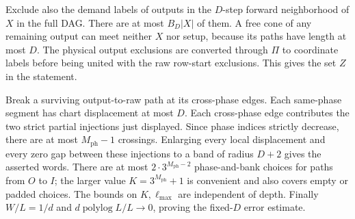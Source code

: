 \begin{informalproof}
Exclude also the demand labels of outputs in the $D$-step forward
neighborhood of $X$ in the full DAG.  There are at most $B_D|X|$ of them.
A free cone of any remaining output can meet neither $X$ nor setup,
because its paths have length at most $D$.  The physical output exclusions
are converted through $\Pi$ to coordinate labels before being united with
the raw row-start exclusions.  This gives the set $Z$ in the statement.

Break a surviving output-to-raw path at its cross-phase edges.  Each
same-phase segment has chart displacement at most $D$.  Each cross-phase
edge contributes the two strict partial injections just displayed.  Since
phase indices strictly decrease, there are at most $M_{\mathrm{ph}}-1$
crossings.  Enlarging every local displacement and every zero gap between
these injections to a band of radius $D+2$ gives the asserted words.
There are at most $2\cdot3^{M_{\mathrm{ph}}-2}$ phase-and-bank choices for paths
from $O$ to $I$; the larger value $K=3^{M_{\mathrm{ph}}}+1$ is convenient and
also covers empty or padded choices.  The bounds on $K,\ell_{\max}$ are independent
of depth.  Finally $W/L=1/d$ and
$d\operatorname{polylog}L/L\to0$, proving the fixed-$D$ error estimate.
\end{informalproof}
